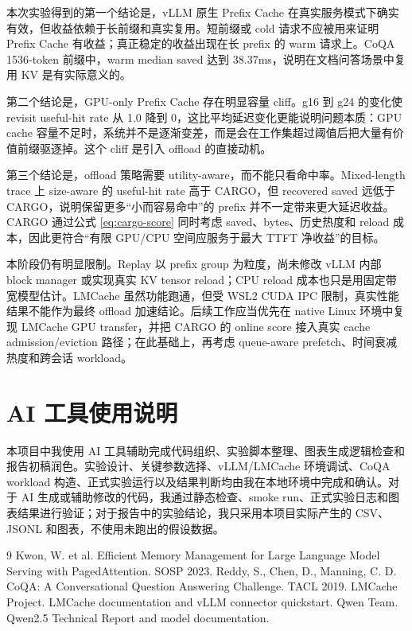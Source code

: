 \documentclass[UTF8,a4paper,10pt]{ctexart}
\begin{document}
本次实验得到的第一个结论是，vLLM 原生 Prefix Cache 在真实服务模式下确实有效，但收益依赖于长前缀和真实复用。短前缀或 cold 请求不应被用来证明 Prefix Cache 有收益；真正稳定的收益出现在长 prefix 的 warm 请求上。CoQA 1536-token 前缀中，warm median saved 达到 38.37ms，说明在文档问答场景中复用 KV 是有实际意义的。

第二个结论是，GPU-only Prefix Cache 存在明显容量 cliff。g16 到 g24 的变化使 revisit useful-hit rate 从 1.0 降到 0，这比平均延迟变化更能说明问题本质：GPU cache 容量不足时，系统并不是逐渐变差，而是会在工作集超过阈值后把大量有价值前缀驱逐掉。这个 cliff 是引入 offload 的直接动机。

第三个结论是，offload 策略需要 utility-aware，而不能只看命中率。Mixed-length trace 上 size-aware 的 useful-hit rate 高于 CARGO，但 recovered saved 远低于 CARGO，说明保留更多“小而容易命中”的 prefix 并不一定带来更大延迟收益。CARGO 通过公式 \ref{eq:cargo-score} 同时考虑 saved、bytes、历史热度和 reload 成本，因此更符合“有限 GPU/CPU 空间应服务于最大 TTFT 净收益”的目标。

本阶段仍有明显限制。Replay 以 prefix group 为粒度，尚未修改 vLLM 内部 block manager 或实现真实 KV tensor reload；CPU reload 成本也只是用固定带宽模型估计。LMCache 虽然功能跑通，但受 WSL2 CUDA IPC 限制，真实性能结果不能作为最终 offload 加速结论。后续工作应当优先在 native Linux 环境中复现 LMCache GPU transfer，并把 CARGO 的 online score 接入真实 cache admission/eviction 路径；在此基础上，再考虑 queue-aware prefetch、时间衰减热度和跨会话 workload。

\section{AI 工具使用说明}

本项目中我使用 AI 工具辅助完成代码组织、实验脚本整理、图表生成逻辑检查和报告初稿润色。实验设计、关键参数选择、vLLM/LMCache 环境调试、CoQA workload 构造、正式实验运行以及结果判断均由我在本地环境中完成和确认。对于 AI 生成或辅助修改的代码，我通过静态检查、smoke run、正式实验日志和图表结果进行验证；对于报告中的实验结论，我只采用本项目实际产生的 CSV、JSONL 和图表，不使用未跑出的假设数据。

\begin{thebibliography}{9}
Kwon, W. et al. Efficient Memory Management for Large Language Model Serving with PagedAttention. SOSP 2023.
Reddy, S., Chen, D., Manning, C. D. CoQA: A Conversational Question Answering Challenge. TACL 2019.
LMCache Project. LMCache documentation and vLLM connector quickstart.
Qwen Team. Qwen2.5 Technical Report and model documentation.
\end{thebibliography}
\end{document}
